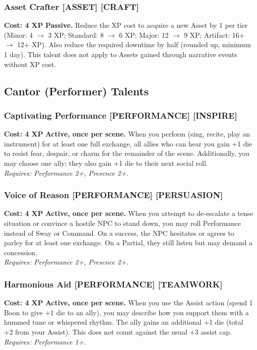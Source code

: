 \documentclass[12pt,a4paper]{book}
\begin{document}
\subsubsection*{Asset Crafter \textnormal{[ASSET] [CRAFT]}}
\label{talent:asset-crafter}
\textbf{Cost: 4 XP} \textbf{Passive.} Reduce the XP cost to acquire a new Asset by 1 per tier (Minor: 4 $\rightarrow$ 3 XP; Standard: 8 $\rightarrow$ 6 XP; Major: 12 $\rightarrow$ 9 XP; Artifact: 16+ $\rightarrow$ 12+ XP). Also reduce the required downtime by half (rounded up, minimum 1 day). This talent does not apply to Assets gained through narrative events without XP cost.

\subsection*{Cantor (Performer) Talents}
\label{sec:major-cantor}

\subsubsection*{Captivating Performance \textnormal{[PERFORMANCE] [INSPIRE]}}
\label{talent:captivating-performance}
\textbf{Cost: 4 XP} \textbf{Active, once per scene.} When you perform (sing, recite, play an instrument) for at least one full exchange, all allies who can hear you gain +1 die to resist fear, despair, or charm for the remainder of the scene. Additionally, you may choose one ally; they also gain +1 die to their next social roll. \\
\textit{Requires: Performance 2+, Presence 2+.}

\subsubsection*{Voice of Reason \textnormal{[PERFORMANCE] [PERSUASION]}}
\label{talent:voice-of-reason}
\textbf{Cost: 4 XP} \textbf{Active, once per scene.} When you attempt to de-escalate a tense situation or convince a hostile NPC to stand down, you may roll Performance instead of Sway or Command. On a success, the NPC hesitates or agrees to parley for at least one exchange. On a Partial, they still listen but may demand a concession. \\
\textit{Requires: Performance 2+, Presence 2+.}

\subsubsection*{Harmonious Aid \textnormal{[PERFORMANCE] [TEAMWORK]}}
\label{talent:harmonious-aid}
\textbf{Cost: 4 XP} \textbf{Active, once per scene.} When you use the Assist action (spend 1 Boon to give +1 die to an ally), you may describe how you support them with a hummed tune or whispered rhythm. The ally gains an additional +1 die (total +2 from your Assist). This does not count against the usual +3 assist cap. \\
\textit{Requires: Performance 1+.}
\end{document}
